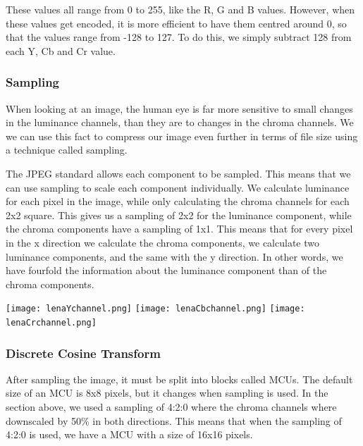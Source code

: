 \begin{infobox}
These values all range from 0 to 255, like the R, G and B values. 
However, when these values get encoded, it is more efficient to have them centred around 0, so that the values range from -128 to 127.
To do this, we simply subtract 128 from each Y, Cb and Cr value.

\vspace{4mm}
\subsubsection*{Sampling}
\vspace{-2.5mm}
When looking at an image, the human eye is far more sensitive to small changes in the luminance channels, than they are to changes in the chroma channels. We we can use this fact to compress our image even further in terms of file size using a technique called sampling. 

The JPEG standard allows each component to be sampled.
This means that we can use sampling to scale each component individually. 
We calculate luminance for each pixel in the image, while only calculating the chroma channels for each 2x2 square.
This gives us a sampling of 2x2 for the luminance component, while the chroma components have a sampling of 1x1.
This means that for every pixel in the x direction we calculate the chroma components, we calculate two luminance components, and the same with the y direction.
In other words, we have fourfold the information about the luminance component than of the chroma components.

\begin{centering}
\texttt{[image: lenaYchannel.png]}
\texttt{[image: lenaCbchannel.png]}
\texttt{[image: lenaCrchannel.png]}
\label{fig:YCbCrChannels}
\end{centering}

\vspace{4mm}
\subsubsection*{Discrete Cosine Transform}
\vspace{-2.5mm}
After sampling the image, it must be split into blocks called MCUs. The default size of an MCU is 8x8 pixels, but it changes when sampling is used. In the section above, we used a sampling of 4:2:0 where the chroma channels where downscaled by 50\% in both directions. This means that when the sampling of 4:2:0 is used, we have a MCU with a size of 16x16 pixels.


\end{infobox}
